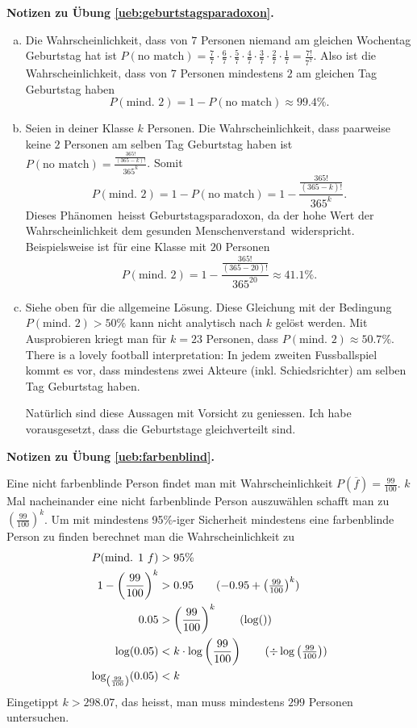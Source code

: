 \documentclass[%
11pt,%
twoside,%
titlepage,%
german,%
headsepline%
]{scrartcl}
\newcommand{\concatueb}[1]{ueb:#1}%
\newcommand{\concatlsg}[1]{lsg:#1}%
\newenvironment{lsg}[1]{%
    \par\noindent\textbf{Notizen zu Übung \ref{\concatueb{#1}}.}%
    \label{\concatlsg{#1}}
}{%
    \par%
}
\newcommand{\definition}[1]{\colorbox{emerald}{#1}}
\begin{document}
\begin{lsg}{geburtstagsparadoxon}
\begin{enumerate}[a)]
\item Die Wahrscheinlichkeit, dass von $7$ Personen niemand am gleichen Wochentag Geburtstag hat ist $P(\text{no match})=\frac{7}{7}\cdot\frac{6}{7}\cdot\frac{5}{7}\cdot\frac{4}{7}\cdot\frac{3}{7}\cdot\frac{2}{7}\cdot\frac{1}{7}=\frac{7!}{7^{7}}$. Also ist die Wahrscheinlichkeit, dass von $7$ Personen mindestens $2$ am gleichen Tag Geburtstag haben
$$P(\text{mind. 2})=1-P(\text{no match})\approx99.4\%.$$
\item Seien in deiner Klasse $k$ Personen. Die Wahrscheinlichkeit, dass paarweise keine $2$ Personen am selben Tag Geburtstag haben ist $P(\text{no match})=\frac{\frac{365!}{(365-k)!}}{365^{k}}$. Somit
$$P(\text{mind. 2})=1-P(\text{no match})=1-\frac{\frac{365!}{(365-k)!}}{365^{k}}.$$
Dieses \glqq Ph\"anomen\grqq\ heisst \definition{Geburtstagsparadoxon}, da der hohe Wert der Wahrscheinlichkeit dem \glqq gesunden Menschenverstand\grqq\ widerspricht. Beispielsweise ist f\"ur eine Klasse mit $20$ Personen
$$P(\text{mind. 2})=1-\frac{\frac{365!}{(365-20)!}}{365^{20}}\approx41.1\%.$$
\item Siehe oben f\"ur die allgemeine L\"osung. Diese Gleichung mit der Bedingung $P(\text{mind. 2})>50\%$ kann nicht analytisch nach $k$ gel\"ost werden. Mit Ausprobieren kriegt man f\"ur $k=23$ Personen, dass $P(\text{mind. 2})\approx50.7\%$. There is a lovely football interpretation: In jedem zweiten Fussballspiel kommt es vor, dass mindestens zwei Akteure (inkl. Schiedsrichter) am selben Tag Geburtstag haben.

Nat\"urlich sind diese Aussagen mit Vorsicht zu geniessen. Ich habe vorausgesetzt, dass die Geburtstage gleichverteilt sind.
\end{enumerate}
\end{lsg}


\begin{lsg}{farbenblind}
Eine nicht farbenblinde Person findet man mit Wahrscheinlichkeit $P(\overline{f})=\frac{99}{100}$. $k$ Mal nacheinander eine nicht farbenblinde Person auszuw\"ahlen schafft man zu $\left(\frac{99}{100}\right)^{k}$. Um mit mindestens 95\%-iger Sicherheit mindestens eine farbenblinde Person zu finden berechnet man die Wahrscheinlichkeit zu
\begin{align*}
P(\text{mind. 1 }f) &> 95\%\\
1-\left(\frac{99}{100}\right)^{k} &> 0.95\tag{$-0.95+\left(\frac{99}{100}\right)^{k}$}\\
0.05 &> \left(\frac{99}{100}\right)^{k} \tag{$\log()$}\\
\log(0.05) &< k\cdot\log\left(\frac{99}{100}\right) \tag{$\div\log\left(\frac{99}{100}\right)$}\\
\log_{\left(\frac{99}{100}\right)}(0.05) &< k
\end{align*}
Eingetippt $k>298.07$, das heisst, man muss mindestens $299$ Personen untersuchen.
\end{lsg}
\end{document}
